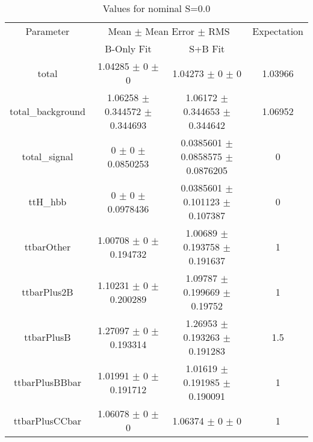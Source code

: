 \begin{table}
\centering
\caption{Values for nominal S=0.0}
\begin{tabular}{cccc}
\toprule
Parameter & \multicolumn{2}{c}{Mean $\pm$ Mean Error $\pm$ RMS} & Expectation\\
 & B-Only Fit & S+B Fit & \\
\midrule
total & \num{1.04285} $\pm$ \num{0} $\pm$ \num{0} & \num{1.04273} $\pm$ \num{0} $\pm$ \num{0} & \num{1.03966}\\
total\_background & \num{1.06258} $\pm$ \num{0.344572} $\pm$ \num{0.344693} & \num{1.06172} $\pm$ \num{0.344653} $\pm$ \num{0.344642} & \num{1.06952}\\
total\_signal & \num{0} $\pm$ \num{0} $\pm$ \num{0.0850253} & \num{0.0385601} $\pm$ \num{0.0858575} $\pm$ \num{0.0876205} & \num{0}\\
ttH\_hbb & \num{0} $\pm$ \num{0} $\pm$ \num{0.0978436} & \num{0.0385601} $\pm$ \num{0.101123} $\pm$ \num{0.107387} & \num{0}\\
ttbarOther & \num{1.00708} $\pm$ \num{0} $\pm$ \num{0.194732} & \num{1.00689} $\pm$ \num{0.193758} $\pm$ \num{0.191637} & \num{1}\\
ttbarPlus2B & \num{1.10231} $\pm$ \num{0} $\pm$ \num{0.200289} & \num{1.09787} $\pm$ \num{0.199669} $\pm$ \num{0.19752} & \num{1}\\
ttbarPlusB & \num{1.27097} $\pm$ \num{0} $\pm$ \num{0.193314} & \num{1.26953} $\pm$ \num{0.193263} $\pm$ \num{0.191283} & \num{1.5}\\
ttbarPlusBBbar & \num{1.01991} $\pm$ \num{0} $\pm$ \num{0.191712} & \num{1.01619} $\pm$ \num{0.191985} $\pm$ \num{0.190091} & \num{1}\\
ttbarPlusCCbar & \num{1.06078} $\pm$ \num{0} $\pm$ \num{0} & \num{1.06374} $\pm$ \num{0} $\pm$ \num{0} & \num{1}\\
\bottomrule
\end{tabular}
\end{table}